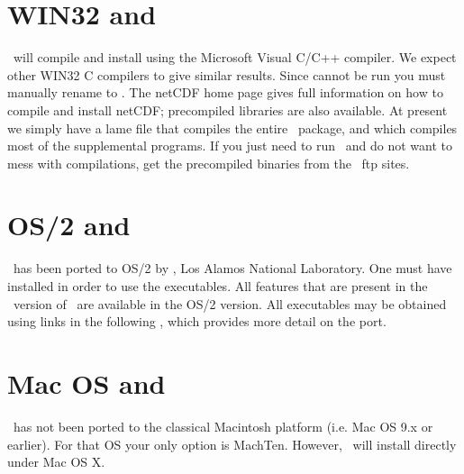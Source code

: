 \section{WIN32 and \gmt}

\GMT\ will compile and install using the Microsoft Visual C/C++
compiler.  We expect other WIN32 C compilers to give similar
results.  Since  cannot be run you
must manually rename  to
.  The netCDF home page gives full
information on how to compile and install netCDF; precompiled
libraries are also available.  At present we simply have a lame 
file that compiles the entire \GMT\
package, and  which compiles most of the
supplemental programs.  If you just need to run \GMT\ and do not want to mess with compilations,
get the precompiled binaries from the \GMT\ ftp sites.


\section{OS/2 and \gmt}

\GMT\ has been ported to OS/2 by ,
Los Alamos National Laboratory.
One must have 
installed in order to use the executables.  All features 
that are present in the \UNIX\ version of \GMT\ are available in the OS/2 version.
All executables may be obtained using links in the following
,
which provides more detail on the port.

\section{Mac OS and \gmt}

\GMT\ has not been ported to the classical Macintosh platform
(i.e. Mac OS 9.x or earlier).  For that OS your only option is MachTen.
However, \GMT\ will install directly under Mac OS X.
